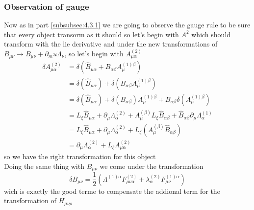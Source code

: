 \documentclass{article}
\begin{document}
\subsubsection{Observation of gauge}
Now as in part \ref{subsubsec:4.3.1} we are going to observe the gauge rule to be sure that every object transorm as it should
so let's begin with $A^{2}$ which should transform with the lie derivative and under the new transformations of $B_{\mu \nu} \rightarrow B_{\mu \nu} + \partial_mu \Lambda_\nu$, so let's begin
with $A^{(2)}_{\mu \alpha}$
\begin{equation}
    \begin{aligned}
        \delta A^{(2)}_{\mu \alpha}&= \delta(\hat B_{\mu \alpha}+ B_{\alpha\beta}A^{(1)\beta}_\mu)\\
        &=\delta(\hat B_{\mu \alpha})+ \delta(B_{\alpha\beta}A^{(1)\beta}_\mu)\\
        &= \delta(\hat B_{\mu \alpha})+ \delta(B_{\alpha\beta})A^{(1)\beta}_\mu+ B_{\alpha\beta}\delta(A^{(1)\beta}_\mu)\\
        &= L_{\xi} \hat B_{\mu \alpha} + \partial_\mu \Lambda^{(2)}_{\alpha}+A^{(\beta)}_\mu L_{\xi} \hat B_{ \alpha \beta } +\hat B_{ \alpha \beta } \partial_\mu \Lambda^{(1)}_\alpha\\
        &= L_{\xi} \hat B_{\mu \alpha} + \partial_\mu \Lambda^{(2)}_{\alpha}+L_{\xi} (A^{(\beta)}_\mu \hat B_{ \alpha \beta })\\
        &=\partial_\mu \Lambda^{(2)}_{\alpha} +L_\xi A^{(2)}_{\mu \alpha}
    \end{aligned}
\end{equation}
so we have the right transformation for this object\\
Doing the same thing with $B_{\mu \nu}$ we come under the transformation 
\begin{equation}
    \delta B_{\mu \nu} = \frac{1}{2}(\Lambda^{(1)\alpha}F^{(2)}_{\mu \nu \alpha} + \lambda^{(2)}_{\alpha}F^{(1)\alpha}_{\mu \nu})
\end{equation}
wich is exactly the good terme to compensate the addional term for the transformation of $H_{\mu \nu \rho}$
\end{document}
